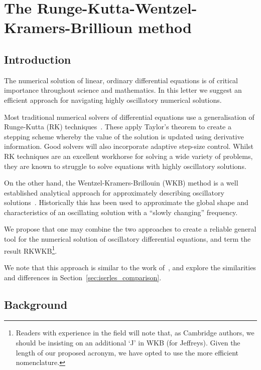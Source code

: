 \chapter[RKWKB]{The Runge-Kutta-Wentzel-Kramers-Brillioun method}
\label{chap:RK}

\section{Introduction}
\label{sec:introduction}
The numerical solution of linear, ordinary differential equations is of critical importance throughout science and mathematics. In this letter we suggest an efficient approach for navigating highly oscillatory numerical solutions.

Most traditional numerical solvers of differential equations use a generalisation of Runge-Kutta (RK) techniques~\citep{Press+2007}. These apply Taylor's theorem to create a stepping scheme whereby the value of the solution is updated using derivative information. Good solvers will also incorporate adaptive step-size control.
Whilst RK techniques are an excellent workhorse for solving a wide variety of problems, they are known to struggle to solve equations with highly oscillatory solutions.

On the other hand, the Wentzel-Kramers-Brillouin (WKB) method is a well established analytical approach for approximately describing oscillatory solutions~\citep{RHB,Bender+2010}. Historically this has been used to approximate the global shape and characteristics of an oscillating solution with a ``slowly changing'' frequency.

We propose that one may combine the two approaches to create a reliable general tool for the numerical solution of oscillatory differential equations, and term the result RKWKB\footnote{Readers with experience in the field will note that, as Cambridge authors, we should be insisting on an additional `J' in WKB (for Jeffreys). Given the length of our proposed acronym, we have opted to use the more efficient nomenclature.}.

We note that this approach is similar to the work of~\cite{Iserles02globalerror,Iserles01thinkglobally}, and explore the similarities and differences in Section~\ref{sec:iserles_comparison}.


\section{Background}

